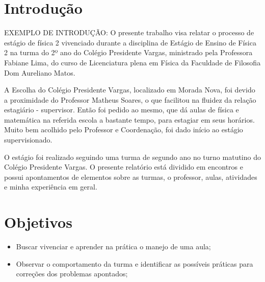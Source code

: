 \documentclass[a4paper, 12 pt]{article}                                	%
\begin{document}
	\newpage


	
	\tableofcontents                        %
	\thispagestyle{empty}					%
	

	
	\newpage                                 %
	
	
	\section{Introdução}
	\label{sec:introducao}
	
	EXEMPLO DE INTRODUÇÃO:
	O presente trabalho visa relatar o processo de estágio de física 2 vivenciado
	durante a disciplina de Estágio de Ensino de Física 2 na turma do 2º ano do Colégio Presidente Vargas, ministrado pela Professora Fabiane Lima, do curso de Licenciatura plena em Física da Faculdade de Filosofia Dom Aureliano Matos.
	
	A Escolha do Colégio Presidente Vargas, localizado em Morada Nova, foi devido a proximidade do Professor Matheus Soares, o que facilitou na fluidez da relação estagiário - supervisor. Então foi pedido ao mesmo, que dá aulas de física e matemática na referida escola a bastante tempo, para estagiar em seus horários. Muito bem acolhido pelo Professor e Coordenação, foi dado início ao estágio supervisionado.
	
	O estágio foi realizado seguindo uma turma de segundo ano no turno matutino do Colégio Presidente Vargas. O presente relatório está dividido em encontros e possui apontamentos de elementos sobre as turmas, o professor, aulas, atividades e minha experiência em geral.
	
	\section{Objetivos} 
	\begin{itemize}   %
		
		\item Buscar vivenciar e aprender na prática o manejo de uma aula;
		\item Observar o comportamento da turma e identificar as possíveis práticas para correções dos problemas apontados;
	\end{itemize}
	
\end{document}
